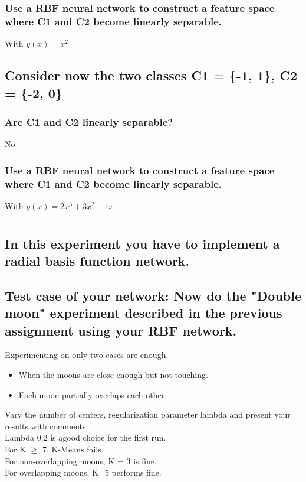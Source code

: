 \documentclass{scrartcl}
\begin{document}
\subsubsection{ Use a RBF neural network to construct a feature space where C1 and C2
become linearly separable.}
With $y(x) = x^{2}$

\subsection{Consider now the two classes C1 = \{-1, 1\}, C2 = \{-2, 0\}}
\subsubsection{Are C1 and C2 linearly separable?}
No
\subsubsection{Use a RBF neural network to construct a feature space where C1 and C2
become linearly separable.}

With $y(x) = 2x^{3} +3x^{2} - 1x$




\section{}
\subsection{ In this experiment you have to implement a radial basis function network.}

\subsection{Test case of your network: Now do the "Double moon" experiment described in the
previous assignment using your RBF network.}

 Experimenting on only two cases are
enough.
\begin{itemize}
\item When the moons are close enough but not touching.
\item Each moon partially overlaps each other.
\end{itemize}
Vary the number of centers, regularization parameter lambda and present your results
with comments:\\

Lambda 0.2 is agood choice for the first run.\\
For K $\geq$ 7, K-Means fails.\\
For non-overlapping moons, K = 3 is fine.\\
For overlapping moons, K=5 performs fine.\\
\end{document}

